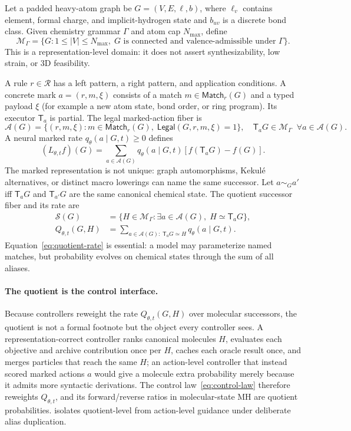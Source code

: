 \documentclass{article}
\newcommand{\M}{\mathcal{M}_{\Gamma}}
\newcommand{\Rset}{\mathcal{R}}
\newcommand{\A}{\mathcal{A}}
\newcommand{\Sset}{\mathcal{S}}
\newcommand{\T}{\mathsf{T}}
\newcommand{\legal}{\mathsf{Legal}}
\newcommand{\Match}{\mathsf{Match}}
\theoremstyle{definition}
\theoremstyle{remark}
\begin{document}
Let a padded heavy-atom graph be $G=(V,E,\ell,b)$, where $\ell_v$ contains element, formal charge, and implicit-hydrogen state and $b_{uv}$ is a discrete bond class. Given chemistry grammar $\Gamma$ and atom cap $N_{\max}$, define
\begin{equation}
\M=\{G:1\le |V|\le N_{\max},\;G\text{ is connected and valence-admissible under }\Gamma\}.
\label{eq:state-space}
\end{equation}
This is a representation-level domain: it does not assert synthesizability, low strain, or 3D feasibility.

A rule $r\in\Rset$ has a left pattern, a right pattern, and application conditions. A concrete mark $a=(r,m,\xi)$ consists of a match $m\in\Match_r(G)$ and a typed payload $\xi$ (for example a new atom state, bond order, or ring program). Its executor $\T_a$ is partial. The legal marked-action fiber is
\begin{equation}
\A(G)=\{(r,m,\xi):m\in\Match_r(G),\;\legal(G,r,m,\xi)=1\},
\quad \T_aG\in\M\;\;\forall a\in\A(G).
\label{eq:legal-fiber}
\end{equation}
A neural marked rate $q_\theta(a\mid G,t)\ge0$ defines
\begin{equation}
(L_{\theta,t}f)(G)=\sum_{a\in\A(G)}q_\theta(a\mid G,t)[f(\T_aG)-f(G)].
\label{eq:marked-generator}
\end{equation}
The marked representation is not unique: graph automorphisms, Kekul\'e alternatives, or distinct macro lowerings can name the same successor. Let $a\sim_G a'$ iff $\T_aG$ and $\T_{a'}G$ are the same canonical chemical state. The quotient successor fiber and its rate are
\begin{align}
\Sset(G)&=\{H\in\M:\exists a\in\A(G),\;H\simeq\T_aG\},\\
Q_{\theta,t}(G,H)&=\sum_{a\in\A(G):\;\T_aG\simeq H}q_\theta(a\mid G,t).
\label{eq:quotient-rate}
\end{align}
Equation~\eqref{eq:quotient-rate} is essential: a model may parameterize named matches, but probability evolves on chemical states through the sum of all aliases.

\paragraph{The quotient is the control interface.}
Because controllers reweight the rate $Q_{\theta,t}(G,H)$ over molecular successors, the quotient is not a formal footnote but the object every controller sees. A representation-correct controller ranks canonical molecules $H$, evaluates each objective and archive contribution once per $H$, caches each oracle result once, and merges particles that reach the same $H$; an action-level controller that instead scored marked actions $a$ would give a molecule extra probability merely because it admits more syntactic derivations. The control law~\eqref{eq:control-law} therefore reweights $Q_{\theta,t}$, and its forward/reverse ratios in molecular-state MH are quotient probabilities.  isolates quotient-level from action-level guidance under deliberate alias duplication.
\end{document}
